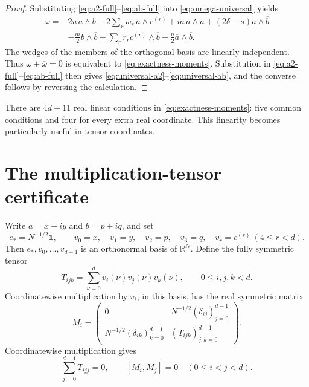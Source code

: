 \documentclass[11pt,reqno]{amsart}
\theoremstyle{remark}
\newcommand{\R}{\mathbb R}
\newcommand{\one}{\mathbf 1}
\begin{document}
\begin{proof}
Substituting \eqref{eq:a2-full}--\eqref{eq:ab-full} into
\eqref{eq:omega-universal} yields
\begin{align*}
 \omega={}&2u\,a\wedge b+2\sum_rw_r\,a\wedge c^{(r)}
 +m\,a\wedge\overline a+(2\delta-s)a\wedge\overline b\\
 &-\frac m2b\wedge\overline b-\sum_rr_r c^{(r)}\wedge\overline b
 -\frac n2\overline a\wedge\overline b.
\end{align*}
The wedges of the members of the orthogonal basis are linearly independent.
Thus $\omega+\overline\omega=0$ is equivalent to
\eqref{eq:exactness-moments}.  Substitution in
\eqref{eq:a2-full}--\eqref{eq:ab-full} then gives
\eqref{eq:universal-a2}--\eqref{eq:universal-ab}, and the converse follows by
reversing the calculation.
\end{proof}

There are $4d-11$ real linear conditions in
\eqref{eq:exactness-moments}: five common conditions and four for every extra
real coordinate.  This linearity becomes particularly useful in tensor
coordinates.

\section{The multiplication-tensor certificate}\label{sec:tensor}

Write $a=x+iy$ and $b=p+iq$, and set
\[
 e_*=N^{-1/2}\one,\qquad
 v_0=x,\quad v_1=y,\quad v_2=p,\quad v_3=q,\quad
 v_r=c^{(r)}\ (4\le r<d).
\]
Then $e_*,v_0,\ldots,v_{d-1}$ is an orthonormal basis of $\R^N$.  Define the
fully symmetric tensor
\begin{equation}\label{eq:tensor-definition}
 T_{ijk}=\sum_{\nu=0}^{d}v_i(\nu)v_j(\nu)v_k(\nu),
 \qquad 0\le i,j,k<d.
\end{equation}
Coordinatewise multiplication by $v_i$, in this basis, has the real
symmetric matrix
\begin{equation}\label{eq:multiplication-matrix}
 M_i=
 \begin{pmatrix}
 0&N^{-1/2}(\delta_{ij})_{j=0}^{d-1}\\
 N^{-1/2}(\delta_{ik})_{k=0}^{d-1}&(T_{ijk})_{j,k=0}^{d-1}
 \end{pmatrix}.
\end{equation}
Coordinatewise multiplication gives
\begin{equation}\label{eq:trace-commute}
 \sum_{j=0}^{d-1}T_{ijj}=0,
 \qquad [M_i,M_j]=0\quad(0\le i<j<d).
\end{equation}
\end{document}
